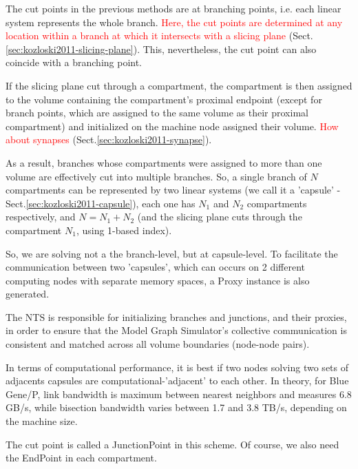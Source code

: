 The cut points in the previous methods are at branching points, i.e. each
linear system represents the whole branch.
\textcolor{red}{Here, the cut points are determined at any location within a
branch at which it intersects with a slicing plane}
(Sect.\ref{sec:kozloski2011-slicing-plane}).
This, nevertheless, the cut point can also coincide with a branching point.

If the slicing plane cut through a compartment, the compartment is then assigned
to the volume containing the compartment's proximal endpoint (except for branch
points, which are assigned to the same volume as their proximal compartment) and
initialized on the machine node assigned their volume. \textcolor{red}{How
about synapses} (Sect.\ref{sec:kozloski2011-synapse}).


As a result, branches whose compartments were assigned to more than one volume
are effectively cut into multiple branches. So, a single branch of $N$
compartments can be represented by two linear systems (we call it a 'capsule' -
Sect.\ref{sec:kozloski2011-capsule}), each one has $N_1$ and $N_2$ compartments
respectively, and $N = N_1 + N_2$ (and the slicing plane cuts through the
compartment $N_1$, using 1-based index).

\begin{mdframed}
So, we are solving not a the branch-level, but at capsule-level.
To facilitate the communication between two 'capsules', which can occurs on 2
different computing nodes with separate memory spaces, a Proxy instance is also
generated. 

The NTS is responsible for initializing branches and junctions, and their
proxies, in order to ensure that the Model Graph Simulator's collective
communication is consistent and matched across all volume boundaries (node-node
pairs).

In terms of computational performance, it is best if two nodes solving two sets
of adjacents capsules are computational-'adjacent' to each other.
In theory, for Blue Gene/P, link bandwidth is maximum between nearest neighbors
and measures 6.8 GB/s, while bisection bandwidth varies between 1.7 and 3.8
TB/s, depending on the machine size.

\end{mdframed}

The cut point is called a JunctionPoint in this scheme. Of course, we also need
the EndPoint in each compartment.


